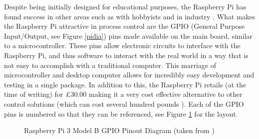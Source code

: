\documentclass[a4]{report}
\begin{document}
	Despite being initially designed for educational purposes, the Raspberry Pi has found success in other areas such as with hobbyists \cite{pihobbynotedu} and in industry \cite{pimorethanedu}. What makes the Raspberry Pi attractive in process control are the GPIO (General Purpose Input/Output, see Figure \ref{pidia}) pins made available on the main board, similar to a microcontroller. These pins allow electronic circuits to interface with the Raspberry Pi, and thus software to interact with the real world in a way that is not easy to accomplish with a traditional computer. This marriage of microcontroller and desktop computer allows for incredibly easy development and testing in a single package. In addition to this, the Raspberry Pi retails (at the time of writing) for \pounds 30.00 \cite{picost} making it a very cost effective alternative to other control solutions (which can cost several hundred pounds \cite{otherpcucost}). Each of the GPIO pins is numbered so that they can be referenced, see Figure \ref{gpiopinout} for the layout.\newline
	\begin{figure}[!htb]
	\centering
	\caption{Raspberry Pi 3 Model B GPIO Pinout Diagram (taken from  \cite{pigpiopinout})}
	\label{gpiopinout}
	\end{figure} \newline  \noindent
\end{document}
